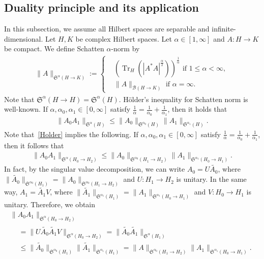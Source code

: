 \documentclass[10pt,a4paper]{amsart}
\newcommand{\CB}{\mathcal{B}}
\newcommand{\FS}{\mathfrak{S}}
\newcommand{\al}{\alpha}
\newcommand{\wt}{\widetilde}
\newcommand{\K}[1]{\left(#1\right)}
\newcommand{\I}{\infty}
\DeclareMathOperator{\Tr}{Tr}
\begin{document}
\subsection{Duality principle and its application} 
In this subsection, we assume all Hilbert spaces are separable and infinite-dimen\-sional. Let $H, K$ be complex Hilbert spaces. Let $\al \in [1,\I]$ and $A: H \to K$ be compact. We define Schatten $\al$-norm by
\begin{align}
\|A\|_{\FS^\al(H\to K)} :=
\begin{cases}
&\K{\Tr_H\left(|A^*A|^{\frac{\al}{2}}\right)}^{\frac{1}{\al}} \text{ if } 1 \le \al <\I,\\
&\|A\|_{\CB(H \to K)} \text{ if } \al = \I.
\end{cases}
\end{align}
Note that $\FS^\al(H \to H)=\FS^\al(H)$. H\"older's inequality for Schatten norm is well-known. If $\al, \al_0, \al_1 \in [0,\I]$ satisfy $\frac{1}{\al}=\frac{1}{\al_0}+\frac{1}{\al_1}$, then it holds that
\begin{align}\label{Holder}
\|A_0 A_1\|_{\FS^{\al}(H)} \le \|A_0\|_{\FS^{\al_0}(H)} \|A_1\|_{\FS^{\al_1}(H)}.
\end{align}
Note that~\eqref{Holder} implies the following. If $\al, \al_0, \al_1 \in [0,\I]$ satisfy $\frac{1}{\al}=\frac{1}{\al_0}+\frac{1}{\al_1}$, then it follows that
\begin{align}\label{g Holder}
\|A_0 A_1\|_{\FS^{\al}(H_0\to H_2)} \le \|A_0\|_{\FS^{\al_0}(H_1 \to H_2)} \|A_1\|_{\FS^{\al_1}(H_0 \to H_1)}.
\end{align}
In fact, by the singular value decomposition, we can write $A_0 = U \wt{A_0}$, where $\|\wt{A_0}\|_{\FS^{\al_0}(H_1)} = \|A_0\|_{\FS^{\al_0}(H_1 \to H_2)}$ and $U:H_1 \to H_2$ is unitary. In the same way, $A_1 = \wt{A_1} V$, where $\|\wt{A_1}\|_{\FS^{\al_1}(H_1)} = \|A_1\|_{\FS^{\al_1}(H_0 \to H_1)}$ and $V:H_0 \to H_1$ is unitary. Therefore, we obtain
\begin{multline}
\|A_0 A_1\|_{\FS^\al(H_0 \to H_2)}\\
\begin{aligned}
 &= \|U \wt{A_0} \wt{A_1} V\|_{\FS^\al(H_0 \to H_2)} = \|\wt{A_0} \wt{A_1}\|_{\FS^\al(H_1)} \\
&\le \|\wt{A_0}\|_{\FS^{\al_0}(H_1)} \|\wt{A_1}\|_{\FS^{\al_1}(H_1)} = \|A\|_{\FS^{\al_0}(H_1 \to H_2)} \|A_1\|_{\FS^{\al_1}(H_0 \to H_1)}.
\end{aligned}
\end{multline}
\end{document}
